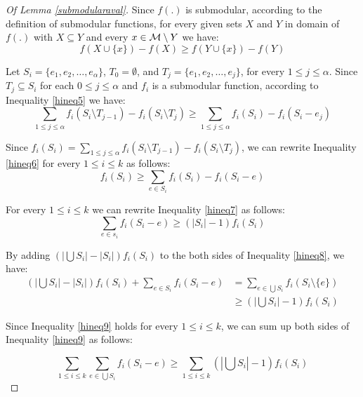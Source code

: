 \begin{proof}[Of Lemma \ref{submodularaval}]
Since $f(.)$ is submodular, according to the definition of submodular functions, for every given sets $X$ and $Y$ in domain of $f(.)$ with $X \subseteq Y$ and every $x \in \mathcal{M} \setminus Y$ we have:
\begin{equation} \label{hineq5} f(X \cup \{x\}) - f(X) \geq f(Y \cup \{x\}) - f(Y) \end{equation}

Let $S_i = \{e_1, e_2, \ldots, e_{\alpha}\}$, $T_0 = \emptyset$, and $T_j = \{e_1, e_2, \ldots, e_j\}$, for every $1 \leq j \leq \alpha$. Since $T_j \subseteq S_i$ for each $0 \leq j \leq \alpha$ and $f_i$ is a submodular function, according to Inequality \eqref{hineq5} we have:
\begin{equation} \label{hineq6} \sum_{1 \leq j \leq \alpha} f_i(S_i \setminus T_{j-1}) - f_i(S_i \setminus T_j) \geq \sum_{1 \leq j \leq \alpha} f_i(S_i) - f_i(S_i - e_j) \end{equation}

Since $f_i(S_i) = \sum_{1 \leq j \leq \alpha} f_i(S_i \setminus T_{j-1}) - f_i(S_i \setminus T_j)$, we can rewrite Inequality \eqref{hineq6} for every $1 \leq i \leq k$ as follows:
\begin{equation} \label{hineq7} f_i(S_i) \geq \sum_{e \in S_i} f_i(S_i) - f_i(S_i - e) \end{equation}

For every $1 \leq i \leq k$ we can rewrite Inequality \eqref{hineq7} as follows:
\begin{equation} \label{hineq8} \sum_{e \in s_i} f_i(S_i-e) \geq (|S_i| - 1) f_i(S_i) \end{equation}

By adding $(|\bigcup S_i| - |S_i|) f_i(S_i)$ to the both sides of Inequality \eqref{hineq8}, we have:
\begin{equation} 
\label{hineq9} 
 \begin{split}
 (|\bigcup S_i| - |S_i|) f_i(S_i) + \sum_{e \in S_i} f_i(S_i - e) &= \sum_{e \in \bigcup S_i} f_i(S_i \setminus \{e\}) \\
 &\geq (|\bigcup S_i| - 1) f_i(S_i)
 \end{split}
\end{equation}

Since Inequality \eqref{hineq9} holds for every $1 \leq i \leq k$, we can sum up both sides of Inequality \eqref{hineq9} as follows:

\begin{equation} \label{hineq10} \sum_{1 \leq i \leq k}\sum_{e \in \bigcup S_i} f_i(S_i - e) \geq \sum_{1 \leq i \leq k} (|\bigcup S_i| - 1) f_i(S_i) \end{equation}


\end{proof}
